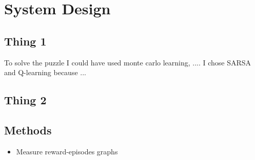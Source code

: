 \graphicspath{{System\_Design/fig}}
\chapter{System Design}
\label{chap:System_Design}



\section{Thing 1}
To solve the puzzle I could have used monte carlo learning, ....
I chose SARSA and Q-learning because ...
\section{Thing 2}

\section{Methods}
\begin{itemize}
	\item Measure reward-episodes graphs
\end{itemize}